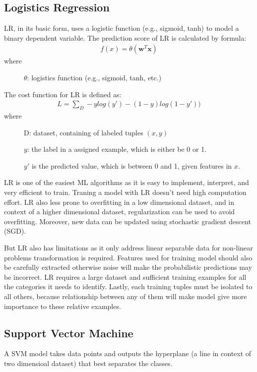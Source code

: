 \subsection{Logistics Regression}
LR, in its basic form, uses a logistic function (e.g., sigmoid, tanh) to model a binary dependent variable.
The prediction score of LR is calculated by formula:
\begin{eqnarray*}
f(x) = \theta(\textbf{w}^{T}\textbf{x})
\end{eqnarray*}
where
\begin{description}

\item[] $\theta$: logistics function (e.g., sigmoid, tanh, etc.)
\end{description}
The cost function for LR is defined as:
\begin{eqnarray*}
L = \sum_{D}^{}-ylog(y')-(1-y)log(1-y'))
\end{eqnarray*}
where
\begin{description}
\item[] D: dataset, containing of labeled tuples $(x,y)$
\item[] $y$: the label in a assigned example, which is either be 0 or 1.
\item[] $y'$ is the predicted value, which is between 0 and 1, given features in $x$.
\end{description}

LR is one of the easiest ML algorithms as it is easy to implement, interpret, and very efficient to train. Traning a model with LR doesn't need high computation effort. LR also less prone to overfitting in a low dimensional dataset, and in context of a higher dimensional dataset, regularization can be used to avoid overfitting. Moreover, new data can be updated using stochastic gradient descent (SGD).

But LR also has limitations as it only address linear separable data for non-linear problems transformation is required. Features used for training model should also be carefully extracted otherwise noise will make the probabilistic predictions may be incorrect. LR requires a large dataset and sufficient training examples for all the categories it needs to identify. Lastly, each training tuples must be isolated to all others, because relationship between any of them will make model give more importance to these relative examples.

\subsection{Support Vector Machine}
A SVM model takes data points and outputs the hyperplane (a line in context of two dimensioal dataset) that best separates the classes.

